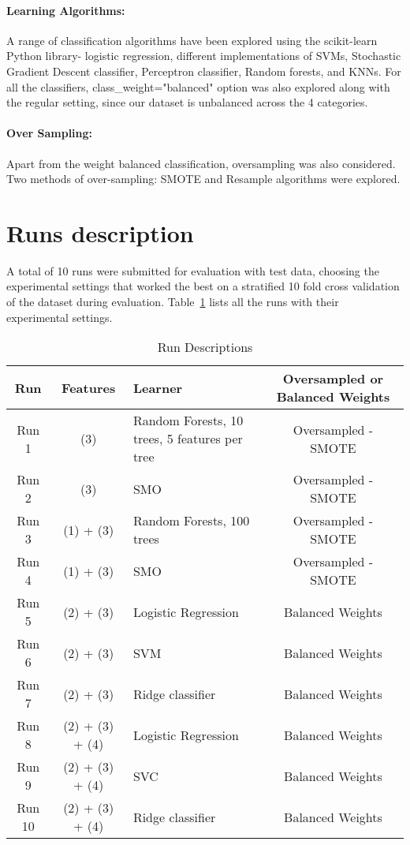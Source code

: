 \documentclass{article}
\begin{document}
\paragraph{Learning Algorithms: }
A range of classification algorithms have been explored using the scikit-learn\cite{Pedregosa.Varoquaux.ea-11} Python library- logistic regression, different implementations of SVMs, Stochastic Gradient Descent classifier, Perceptron classifier, Random forests, and KNNs. For all the classifiers, class\_weight="balanced" option was also  explored along with the regular setting, since our dataset is unbalanced across the 4 categories.  

\paragraph{Over Sampling: } Apart from the weight balanced classification, oversampling was also considered. Two methods of over-sampling: SMOTE \cite{Chawla.Bowyer.ea-02} and Resample algorithms were explored. 

\section{Runs description}
A total of 10 runs were submitted for evaluation with test data, choosing the experimental settings that worked the best on a stratified 10 fold cross validation of the dataset during evaluation. Table~\ref{tab:Table1} lists all the runs with their experimental settings. 
\begin{table}[h!]
\begin{center}
\begin{tabular}{|c|c|l|c|}
\hline
\textbf Run & \textbf {Features} & \textbf {Learner} & \textbf{Oversampled or Balanced Weights} \\
\hline
\hline Run 1 &  (3) & Random Forests, 10 trees, 5 features per tree & Oversampled - SMOTE \\
\hline Run 2 & (3) & SMO & Oversampled - SMOTE \\
\hline Run 3 & (1) + (3) & Random Forests, 100 trees & Oversampled - SMOTE\\
\hline Run 4 & (1) + (3) &SMO & Oversampled - SMOTE \\
\hline Run 5 & (2) + (3) & Logistic Regression & Balanced Weights \\
\hline Run 6 & (2) + (3) & SVM & Balanced Weights\\
\hline Run 7 & (2) + (3) & Ridge classifier & Balanced Weights\\
\hline Run 8 & (2) + (3) + (4) & Logistic Regression & Balanced Weights \\
\hline Run 9 & (2) + (3) + (4)  & SVC & Balanced Weights\\
\hline Run 10 & (2) + (3) + (4) & Ridge classifier & Balanced Weights \\
\hline
\end{tabular}
\caption{Run Descriptions}
\label{tab:Table1}
\end{center}
\end{table}
\end{document}
